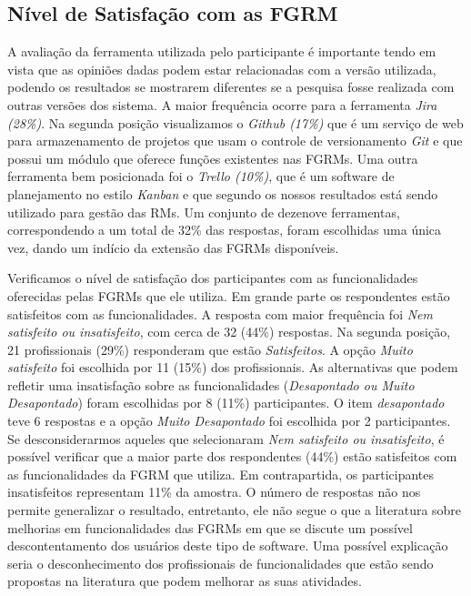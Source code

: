 \subsection{Nível de Satisfação com as FGRM}\label{sub:nivel_de_satisfação_com_as_fgrm}

A avaliação da ferramenta utilizada pelo participante é importante tendo em
vista que as opiniões dadas podem estar relacionadas com a versão utilizada,
podendo os resultados se mostrarem diferentes se a pesquisa fosse realizada com
outras versões dos sistema. A maior frequência ocorre para a ferramenta
\textit{Jira (28\%)}. Na segunda posição visualizamos o \textit{Github (17\%)}
que é um serviço de web para armazenamento de projetos que usam o controle de
versionamento \textit{Git} e que possui um módulo que oferece funções
existentes nas FGRMs. Uma outra ferramenta bem posicionada foi o \textit{Trello
    (10\%)}, que é um software de planejamento no estilo \textit{Kanban} e que
segundo os nossos resultados está sendo utilizado para gestão das RMs. Um
conjunto de dezenove ferramentas, correspondendo a um total de 32\% das
respostas, foram escolhidas uma única vez, dando um indício da extensão das
FGRMs disponíveis.


Verificamos o nível de satisfação dos participantes com as funcionalidades
oferecidas pelas FGRMs que ele utiliza. Em grande parte os respondentes estão
satisfeitos com as funcionalidades. A resposta com maior frequência foi
\textit{Nem satisfeito ou insatisfeito}, com cerca de 32 (44\%) respostas. Na
segunda posição, 21 profissionais (29\%) responderam que estão
\textit{Satisfeitos}. A opção \textit{Muito satisfeito} foi escolhida por 11
(15\%) dos profissionais. As alternativas que podem refletir uma insatisfação
sobre as funcionalidades (\textit{Desapontado ou Muito Desapontado}) foram
escolhidas por 8 (11\%) participantes. O item \textit{desapontado} teve 6
respostas e a opção \textit{Muito Desapontado} foi escolhida por 2
participantes. Se desconsiderarmos aqueles que selecionaram \textit{Nem
    satisfeito ou insatisfeito}, é possível verificar que a maior parte dos
respondentes (44\%) estão satisfeitos com as funcionalidades da FGRM que
utiliza. Em contrapartida, os participantes insatisfeitos representam 11\% da
amostra. O número de respostas não nos permite generalizar o resultado,
entretanto, ele não segue o que a literatura sobre melhorias em funcionalidades
das FGRMs em que se discute um possível descontentamento dos usuários deste
tipo de software. Uma possível explicação seria o desconhecimento dos
profissionais de funcionalidades que estão sendo propostas na literatura que
podem melhorar as suas atividades.

